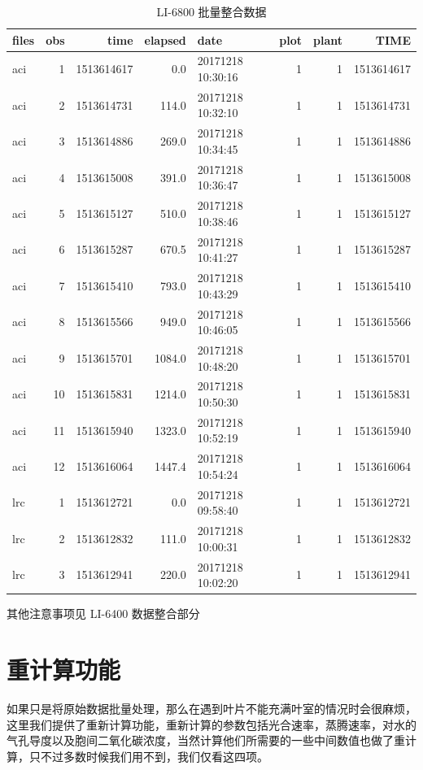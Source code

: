 \documentclass[
]{krantz}
\begin{document}
\begin{table}

\caption{\label{tab:unnamed-chunk-8}LI-6800 批量整合数据}
\centering
\begin{tabular}[t]{lrrrlrrr}
\toprule
files & obs & time & elapsed & date & plot & plant & TIME\\
\midrule
aci & 1 & 1513614617 & 0.0 & 20171218 10:30:16 & 1 & 1 & 1513614617\\
aci & 2 & 1513614731 & 114.0 & 20171218 10:32:10 & 1 & 1 & 1513614731\\
aci & 3 & 1513614886 & 269.0 & 20171218 10:34:45 & 1 & 1 & 1513614886\\
aci & 4 & 1513615008 & 391.0 & 20171218 10:36:47 & 1 & 1 & 1513615008\\
aci & 5 & 1513615127 & 510.0 & 20171218 10:38:46 & 1 & 1 & 1513615127\\
\addlinespace
aci & 6 & 1513615287 & 670.5 & 20171218 10:41:27 & 1 & 1 & 1513615287\\
aci & 7 & 1513615410 & 793.0 & 20171218 10:43:29 & 1 & 1 & 1513615410\\
aci & 8 & 1513615566 & 949.0 & 20171218 10:46:05 & 1 & 1 & 1513615566\\
aci & 9 & 1513615701 & 1084.0 & 20171218 10:48:20 & 1 & 1 & 1513615701\\
aci & 10 & 1513615831 & 1214.0 & 20171218 10:50:30 & 1 & 1 & 1513615831\\
\addlinespace
aci & 11 & 1513615940 & 1323.0 & 20171218 10:52:19 & 1 & 1 & 1513615940\\
aci & 12 & 1513616064 & 1447.4 & 20171218 10:54:24 & 1 & 1 & 1513616064\\
lrc & 1 & 1513612721 & 0.0 & 20171218 09:58:40 & 1 & 1 & 1513612721\\
lrc & 2 & 1513612832 & 111.0 & 20171218 10:00:31 & 1 & 1 & 1513612832\\
lrc & 3 & 1513612941 & 220.0 & 20171218 10:02:20 & 1 & 1 & 1513612941\\
\bottomrule
\end{tabular}
\end{table}

其他注意事项见 LI-6400 数据整合部分

\hypertarget{recompute_raw}{%
\section{重计算功能}\label{recompute_raw}}

如果只是将原始数据批量处理，那么在遇到叶片不能充满叶室的情况时会很麻烦，这里我们提供了重新计算功能，重新计算的参数包括光合速率，蒸腾速率，对水的气孔导度以及胞间二氧化碳浓度，当然计算他们所需要的一些中间数值也做了重计算，只不过多数时候我们用不到，我们仅看这四项。
\end{document}
